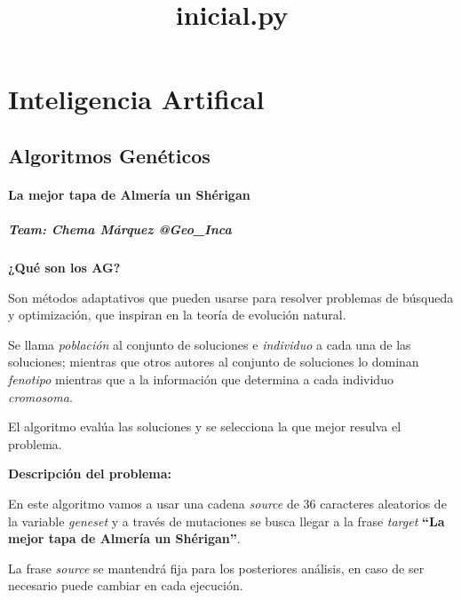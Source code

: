 \documentclass[11pt]{article}
\title{inicial.py}
\begin{document}
    
    
    \maketitle
    
    

    
    \hypertarget{inteligencia-artifical}{%
\section{Inteligencia Artifical}\label{inteligencia-artifical}}

\hypertarget{algoritmos-genuxe9ticos}{%
\subsection{Algoritmos Genéticos}\label{algoritmos-genuxe9ticos}}

\hypertarget{la-mejor-tapa-de-almeruxeda-un-shuxe9rigan}{%
\paragraph{La mejor tapa de Almería un
Shérigan}\label{la-mejor-tapa-de-almeruxeda-un-shuxe9rigan}}

\hypertarget{team-chema-muxe1rquez-geo_inca}{%
\subparagraph{Team: Chema Márquez
@Geo\_Inca}\label{team-chema-muxe1rquez-geo_inca}}

\textbf{¿Qué son los AG?}

Son métodos adaptativos que pueden usarse para resolver problemas de
búsqueda y optimización, que inspiran en la teoría de evolución natural.

Se llama \emph{población} al conjunto de soluciones e \emph{individuo} a
cada una de las soluciones; mientras que otros autores al conjunto de
soluciones lo dominan \emph{fenotipo} mientras que a la información que
determina a cada individuo \emph{cromosoma}.

El algoritmo evalúa las soluciones y se selecciona la que mejor resulva
el problema.

\textbf{Descripción del problema:}

En este algoritmo vamos a usar una cadena \emph{source} de 36 caracteres
aleatorios de la variable \emph{geneset} y a través de mutaciones se
busca llegar a la frase \emph{target} \textbf{``La mejor tapa de Almería
un Shérigan''}.

La frase \emph{source} se mantendrá fija para los posteriores análisis,
en caso de ser necesario puede cambiar en cada ejecución.
\end{document}
